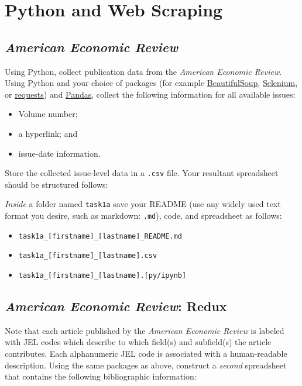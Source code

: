 \documentclass[11pt, letterpaper, twoside]{article}
\begin{document}
\newpage

\section{Python and Web Scraping}

\subsection{\textit{American Economic Review}}
Using Python, collect publication data from the \textit{American Economic Review}. Using Python and your choice of packages (for example \href{https://www.crummy.com/software/BeautifulSoup/bs4/doc/}{BeautifulSoup}, \href{https://selenium-python.readthedocs.io/}{Selenium}, or \href{https://requests.readthedocs.io/en/latest/}{requests}) and \href{https://pandas.pydata.org/docs/}{Pandas}, collect the following information for all available issues:


\begin{itemize}
    \item Volume number;
    \item a hyperlink; and
    \item issue-date information.
\end{itemize}   


Store the collected issue-level data in a \verb|.csv| file. Your resultant spreadsheet should be structured follows:



\textit{Inside} a folder named \verb|task1a| save your README (use any widely used text format you desire, such as markdown: \verb|.md|), code, and spreadsheet as follows:
\begin{itemize}
    \item \verb|task1a_[firstname]_[lastname]_README.md|
    \item \verb|task1a_[firstname]_[lastname].csv|
    \item \verb|task1a_[firstname]_[lastname].[py/ipynb]|
\end{itemize}

\subsection{\textit{American Economic Review}: Redux}
Note that each article published by the \textit{American Economic Review} is labeled with JEL codes which describe to which field(s) and subfield(s) the article contributes. Each alphanumeric JEL code is associated with a human-readable description. Using the same packages as above, construct a \textit{second} spreadsheet that contains the following bibliographic information:
\end{document}
